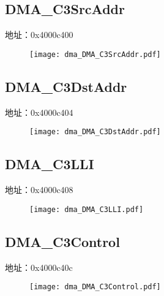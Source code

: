 \subsection{DMA\_C3SrcAddr}
\label{dma-DMA-C3SrcAddr}
地址：0x4000c400
 \begin{figure}[H]
\texttt{[image: dma\_DMA\_C3SrcAddr.pdf]}
\end{figure}

\subsection{DMA\_C3DstAddr}
\label{dma-DMA-C3DstAddr}
地址：0x4000c404
 \begin{figure}[H]
\texttt{[image: dma\_DMA\_C3DstAddr.pdf]}
\end{figure}

\subsection{DMA\_C3LLI}
\label{dma-DMA-C3LLI}
地址：0x4000c408
 \begin{figure}[H]
\texttt{[image: dma\_DMA\_C3LLI.pdf]}
\end{figure}

\subsection{DMA\_C3Control}
\label{dma-DMA-C3Control}
地址：0x4000c40c
 \begin{figure}[H]
\texttt{[image: dma\_DMA\_C3Control.pdf]}
\end{figure}

